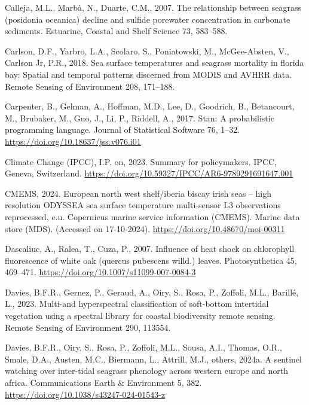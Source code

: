 \documentclass[
  letterpaper,
  DIV=11,
  numbers=noendperiod]{scrartcl}
\newlength{\cslhangindent}
\newenvironment{CSLReferences}[2] %
 {\begin{list}{}{%
  \setlength{\itemindent}{0pt}
  \setlength{\leftmargin}{0pt}
  \setlength{\parsep}{0pt}
  \ifodd #1
   \setlength{\leftmargin}{\cslhangindent}
   \setlength{\itemindent}{-1\cslhangindent}
  \fi
  \setlength{\itemsep}{#2\baselineskip}}}
 {\end{list}}
\begin{document}
\begin{CSLReferences}{1}{0}
Calleja, M.L., Marbà, N., Duarte, C.M., 2007. The relationship between
seagrass (posidonia oceanica) decline and sulfide porewater
concentration in carbonate sediments. Estuarine, Coastal and Shelf
Science 73, 583--588.

Carlson, D.F., Yarbro, L.A., Scolaro, S., Poniatowski, M., McGee-Absten,
V., Carlson Jr, P.R., 2018. Sea surface temperatures and seagrass
mortality in florida bay: Spatial and temporal patterns discerned from
MODIS and AVHRR data. Remote Sensing of Environment 208, 171--188.

Carpenter, B., Gelman, A., Hoffman, M.D., Lee, D., Goodrich, B.,
Betancourt, M., Brubaker, M., Guo, J., Li, P., Riddell, A., 2017. Stan:
A probabilistic programming language. Journal of Statistical Software
76, 1--32. \url{https://doi.org/10.18637/jss.v076.i01}

Climate Change (IPCC), I.P. on, 2023. Summary for policymakers. IPCC,
Geneva, Switzerland.
\url{https://doi.org/10.59327/IPCC/AR6-9789291691647.001}

CMEMS, 2024. European north west shelf/iberia biscay irish seas -- high
resolution ODYSSEA sea surface temperature multi-sensor L3 observations
reprocessed, e.u. Copernicus marine service information (CMEMS). Marine
data store (MDS). (Accessed on 17-10-2024).
\url{https://doi.org/10.48670/moi-00311}

Dascaliuc, A., Ralea, T., Cuza, P., 2007. Influence of heat shock on
chlorophyll fluorescence of white oak (quercus pubescens willd.) leaves.
Photosynthetica 45, 469--471.
\url{https://doi.org/10.1007/s11099-007-0084-3}

Davies, B.F.R., Gernez, P., Geraud, A., Oiry, S., Rosa, P., Zoffoli,
M.L., Barillé, L., 2023. Multi-and hyperspectral classification of
soft-bottom intertidal vegetation using a spectral library for coastal
biodiversity remote sensing. Remote Sensing of Environment 290, 113554.

Davies, B.F.R., Oiry, S., Rosa, P., Zoffoli, M.L., Sousa, A.I., Thomas,
O.R., Smale, D.A., Austen, M.C., Biermann, L., Attrill, M.J., others,
2024a. A sentinel watching over inter-tidal seagrass phenology across
western europe and north africa. Communications Earth \& Environment 5,
382. \url{https://doi.org/10.1038/s43247-024-01543-z}


\end{CSLReferences}
\end{document}
